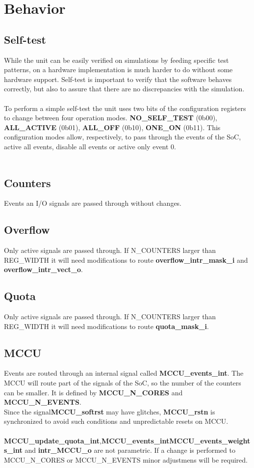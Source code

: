 \section{Behavior}\label{behavior}

\subsection{Self-test}
While the unit can be easily verified on simulations by feeding specific test patterns, on a hardware implementation is much harder to do without some hardware support. Self-test is important to verify that the software behaves correctly, but also to assure that there are no discrepancies with the simulation.\\
\\
To perform a simple self-test the unit uses two bits of the configuration registers to change between four operation modes. \textbf{NO\_SELF\_TEST} (0b00), \textbf{ALL\_ACTIVE} (0b01), \textbf{ALL\_OFF} (0b10), \textbf{ONE\_ON} (0b11). This configuration modes allow, respectively, to pass through the events of the SoC, active all events, disable all events or active  only event 0.\\
\\ 
\subsection{Counters}
Events an I/O signals are passed through without changes.

\subsection{Overflow}
Only active signals are passed through. If N\_COUNTERS larger than REG\_WIDTH it will need modifications to route \textbf{overflow\_intr\_mask\_i} and \textbf{overflow\_intr\_vect\_o}.

\subsection{Quota}
Only active signals are passed through. If N\_COUNTERS larger than REG\_WIDTH it will need modifications to route \textbf{quota\_mask\_i}.

\subsection{MCCU}
Events are routed through an internal signal called \textbf{MCCU\_events\_int}. The MCCU will route part of the signals of the SoC, so the number of the counters can be smaller. It is defined by \textbf{MCCU\_N\_CORES} and \textbf{MCCU\_N\_EVENTS}.\\
Since the signal\textbf{MCCU\_softrst} may have glitches, \textbf{MCCU\_rstn} is synchronized to avoid such conditions and unpredictable resets on MCCU.\\
\\
\textbf{MCCU\_update\_quota\_int},\textbf{MCCU\_events\_int}\textbf{MCCU\_events\_weights\_int} and \textbf{intr\_MCCU\_o} are not parametric. If a change is performed to MCCU\_N\_CORES or MCCU\_N\_EVENTS minor adjustmens will be required.

